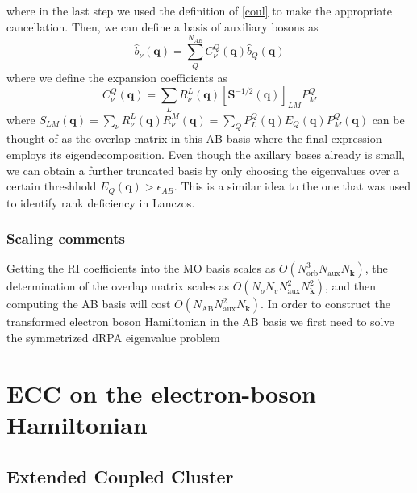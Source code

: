 where in the last step we used the definition of \ref{coul} to make the appropriate cancellation. Then, we can define a basis of auxiliary bosons as
\begin{equation}
    \hat{b}_\nu(\mathbf{q}) = \sum_Q^{N_{AB}} C_\nu^Q(\mathbf{q}) \hat{b}_Q(\mathbf{q})
\end{equation}
where we define the expansion coefficients as
\begin{equation}
    C_\nu^Q(\mathbf{q}) = \sum_L R_\nu^L(\mathbf{q})\left[\bm{S}^{-1 / 2}(\mathbf{q})\right]_{L M} P_M^Q
\end{equation}
where $S_{L M}(\mathbf{q}) = \sum_\nu R_\nu^L(\mathbf{q}) R_\nu^M(\mathbf{q})= \sum_Q P_L^Q (\mathbf{q}) E_Q(\mathbf{q}) P_M^Q(\mathbf{q})$ can be thought of as the overlap matrix in this AB basis where the final expression employs its eigendecomposition. Even though the axillary bases already is small, we can obtain a further truncated basis by only choosing the eigenvalues over a certain threshhold $E_Q(\mathbf{q}) > \epsilon_{AB}$. This is a similar idea to the one that was used to identify rank deficiency in Lanczos. 
\subsubsection{Scaling comments}
Getting the RI coefficients into the MO basis scales as $O(N_{\text{orb}}^3N_{\text{aux}}N_{\mathbf{k}})$, the determination of the overlap matrix scales as $O(N_oN_vN_{\text{aux}}^2N_{\mathbf{k}}^2)$, and then computing the AB basis will cost $O(N_{\text{AB}}N_{\text{aux}}^2N_{\mathbf{k}})$. In order to construct the transformed electron boson Hamiltonian in the AB basis we first need to solve the symmetrized dRPA eigenvalue problem 

\section{ECC on the electron-boson Hamiltonian}

\subsection{Extended Coupled Cluster}
\label{sec:ECC}


